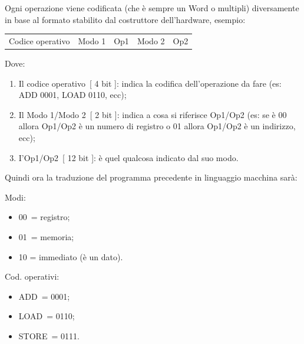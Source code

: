 \documentclass[
]{article}
\providecommand{\tightlist}{%
  \setlength{\itemsep}{0pt}\setlength{\parskip}{0pt}}
\begin{document}
{}

{}

{Ogni operazione viene codificata (che è sempre un Word o multipli)
diversamente in base al formato stabilito dal costruttore dell'hardware,
esempio:}

{}

{}

\begin{longtable}[]{@{}lllll@{}}
\toprule\noalign{}
\endhead
\bottomrule\noalign{}
\endlastfoot
{Codice operativo} & {Modo 1} & {Op1} & {Modo 2} & {Op2} \\
\end{longtable}

{}

{Dove:}

\begin{enumerate}
\tightlist
\item
  {Il }{codice operativo}{~{[} 4 bit {]}: indica la codifica
  dell'operazione da fare (es: ADD 0001, LOAD 0110, ecc);}
\item
  {Il }{Modo 1/Modo 2}{~{[} 2 bit {]}: indica a cosa si riferisce
  }{Op1/Op2 }{(es: se è 00 allora Op1/Op2 è un numero di registro o 01
  allora Op1/Op2 è un indirizzo, ecc);}
\item
  {I'}{Op1/Op2}{~{[} 12 bit {]}: è quel qualcosa indicato dal suo modo.}
\end{enumerate}

{}

{Quindi ora la traduzione del programma precedente in linguaggio
macchina sarà:}

{}

{Modi}{:}

\begin{itemize}
\tightlist
\item
  {00}{~= registro; ~ ~ ~ ~ ~ ~ ~ ~ ~ ~ ~ ~ ~ ~ ~ ~ ~ ~ ~ ~ ~ ~ ~ ~ ~ ~
  ~ ~ ~ }
\item
  {01}{~= memoria;}
\item
  {10 }{= immediato (è un dato).}
\end{itemize}

{}

{Cod. operativi}{:}

\begin{itemize}
\tightlist
\item
  {ADD}{~= 0001;}
\item
  {LOAD}{~= 0110;}
\item
  {STORE}{~= 0111.}
\end{itemize}
\end{document}
